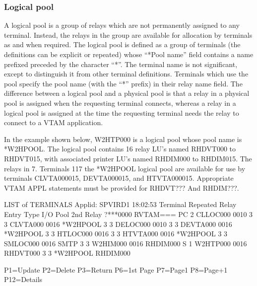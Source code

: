 \documentclass[letterpaper,10pt,english]{sphinxmanual}
\begin{document}
\sphinxAtStartPar
{}


\subsubsection{Logical pool}
\label{\detokenize{connectivity_guide:logical-pool}}\label{\detokenize{connectivity_guide:v461cn-logicalpool}}
\sphinxAtStartPar
A logical pool is a group of relays which are not permanently assigned to any terminal. Instead, the relays in the group are available for allocation by terminals as and when required. The logical pool is defined as a group of terminals (the definitions can be explicit or repeated) whose “*Pool name” field contains a name prefixed preceded by the character “*”. The terminal name is not significant, except to distinguish it from other terminal definitions. Terminals which use the pool specify the pool name (with the “*” prefix) in their relay name field. The difference between a logical pool and a physical pool is that a relay in a physical pool is assigned when the requesting terminal connects, whereas a relay in a logical pool is assigned at the time the requesting terminal needs the relay to connect to a VTAM application.

\sphinxAtStartPar
In the example shown below, W2HTP000 is a logical pool whose pool name is *W2HPOOL. The logical pool contains 16 relay LU’s named RHDVT000 to RHDVT015, with associated printer LU’s named RHDIM000 to RHDIM015. The relays in 7. Terminals 117 the *W2HPOOL logical pool are available for use by terminals CLVTA000\sphinxhyphen{}015, DEVTA000\sphinxhyphen{}015, and HTVTA000\sphinxhyphen{}015. Appropriate VTAM APPL statements must be provided for RHDVT??? And RHDIM???.

\begin{sphinxVerbatim}[commandchars=\\\{\}]
LIST of TERMINALS \PYGZhy{}\PYGZhy{}\PYGZhy{}\PYGZhy{}\PYGZhy{}\PYGZhy{}\PYGZhy{}\PYGZhy{}\PYGZhy{}\PYGZhy{}\PYGZhy{}\PYGZhy{}\PYGZhy{}\PYGZhy{}\PYGZhy{}\PYGZhy{}\PYGZhy{}\PYGZhy{}\PYGZhy{}\PYGZhy{}\PYGZhy{}\PYGZhy{}\PYGZhy{}\PYGZhy{}\PYGZhy{}\PYGZhy{}\PYGZhy{}\PYGZhy{}\PYGZhy{}\PYGZhy{}\PYGZhy{}\PYGZhy{}\PYGZhy{}\PYGZhy{} Applid: SPVIRD1 18:02:53
Terminal Repeated    Relay       Entry    Type I/O  Pool      2nd Relay
?***0000             RVTAM===    PC       2
CLLOC000 0010                             3    3
CLVTA000 0016        *W2HPOOL             3    3
DELOC000 0010                             3    3
DEVTA000 0016        *W2HPOOL             3    3
HTLOC000 0016                             3    3
HTVTA000 0016        *W2HPOOL             3    3
SMLOC000 0016                    SMTP     3    3
W2HIM000 0016        RHDIM000             S    1
W2HTP000 0016        RHDVT000             3    3    *W2HPOOL   RHDIM000



P1=Update            P2=Delete            P3=Return             P6=1st Page
P7=Page\PYGZhy{}1            P8=Page+1            P12=Details
\end{sphinxVerbatim}
\end{document}
